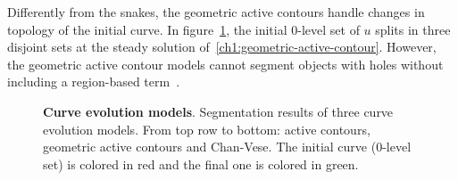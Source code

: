 Differently from the snakes, the geometric active contours handle changes in topology of the initial curve. In figure~\cref{ch1:fig:comparison-curve-evolution}, the initial $0$-level set of $u$ splits in three disjoint sets at the steady solution of~\cref{ch1:geometric-active-contour}. However, the geometric active contour models cannot segment objects with holes without including a region-based term~\cite{chen06}.

\begin{figure}
\center
{}\hspace{2em}%
\hspace{2em}%
%
\caption{\textbf{Curve evolution models}. Segmentation results of three curve evolution models. From top row to bottom: active contours, geometric active contours and Chan-Vese. The initial curve ($0$-level set) is colored in red and the final one is colored in green.}
\label{ch1:fig:comparison-curve-evolution}
\end{figure}


